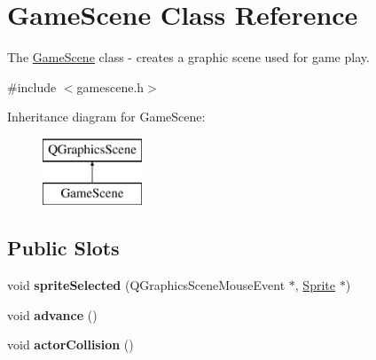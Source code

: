\hypertarget{class_game_scene}{}\section{Game\+Scene Class Reference}
\label{class_game_scene}


The \hyperlink{class_game_scene}{Game\+Scene} class -\/ creates a graphic scene used for game play.  




{\ttfamily \#include $<$gamescene.\+h$>$}

Inheritance diagram for Game\+Scene\+:\begin{figure}[H]
\begin{center}
\leavevmode
\includegraphics[height=2.000000cm]{class_game_scene}
\end{center}
\end{figure}
\subsection*{Public Slots}
\begin{DoxyCompactItemize}
\item 
\mbox{\label{class_game_scene_a5eaeebac1ab47bc9cb51dba7273f787d}} 
void {\bfseries sprite\+Selected} (Q\+Graphics\+Scene\+Mouse\+Event $\ast$, \hyperlink{class_sprite}{Sprite} $\ast$)
\item 
\mbox{\label{class_game_scene_a54b85a8a3edf7109043576175845cae0}} 
void {\bfseries advance} ()
\item 
\mbox{\label{class_game_scene_ad692069ae30670af3c614c0b783622f3}} 
void {\bfseries actor\+Collision} ()
\end{DoxyCompactItemize}
